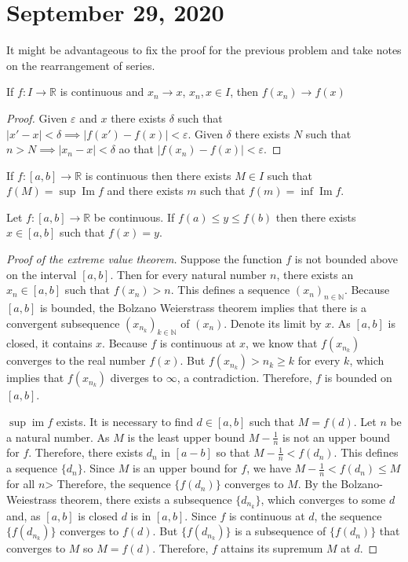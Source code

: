 \documentclass{article}
\newcommand{\N}{\mathbb{N}}
\newcommand{\R}{\mathbb{R}}
\renewcommand{\Im}{\operatorname{Im}}
\newcommand{\eps}{\varepsilon}
\newcommand{\ra}[1][]{\xrightarrow{#1}}
\DeclareMathOperator{\im}{im}
\begin{document}
\section{September 29, 2020}
\begin{remark}
It might be advantageous to fix the proof for the previous problem and take notes on the rearrangement of series.
\end{remark}
\begin{proposition}
If $f:I\ra \R$ is continuous and $x_n\ra x$, $x_n,x\in I$, then $f(x_n)\ra f(x)$
\end{proposition}
\begin{proof}
Given $\eps$ and $x$ there exists $\delta$ such that $|x'-x|<\delta\implies |f(x')-f(x)|<\eps$. Given $\delta$ there exists $N$ such that $n>N\implies |x_n-x|<\delta$ ao that $|f(x_n)-f(x)|<\eps$.
\end{proof}
\begin{theorem}
If $f:[a,b]\ra \R$ is continuous then there exists $M\in I$ such that $f(M)=\sup\Im f$ and there exists $m$ such that $f(m)=\inf\Im f$.
\end{theorem}
\begin{theorem}
Let $f:[a,b]\ra \R$ be continuous. If $f(a)\leq y\leq f(b)$ then there exists $x\in [a,b]$ such that $f(x)=y$.
\end{theorem}
\begin{proof}[Proof of the extreme value theorem]
Suppose the function $f$ is not bounded above on the interval $[a,b]$. Then for every natural number $n$, there exists an $x_n\in [a,b]$ such that $f(x_n)>n$. This defines a sequence $(x_n)_{n\in\N}$. Because $[a,b]$ is bounded, the Bolzano Weierstrass theorem implies that there is a convergent subsequence $(x_{n_k})_{k\in\N}$ of $(x_n)$. Denote its limit by $x$. As $[a,b]$ is closed, it contains $x$. Because $f$ is continuous at $x$, we know that $f(x_{n_k})$ converges to the real number $f(x)$. But $f(x_{n_k})>n_k\geq k$ for every $k$, which implies that $f(x_{n_k})$ diverges to $\infty$, a contradiction. Therefore, $f$ is bounded on $[a,b]$.

$\sup\im f$ exists. It is necessary to find $d\in [a,b]$ such that $M=f(d)$. Let $n$ be a natural number. As $M$ is the least upper bound $M-\frac{1}{n}$ is not an upper bound for $f$. Therefore, there exists $d_n$ in $[a-b]$ so that $M-\frac{1}{n}<f(d_n)$. This defines a sequence $\{d_n\}$. Since $M$ is an upper bound for $f$, we have $M-\frac{1}{n}<f(d_n)\leq M$ for all $n$> Therefore, the sequence $\{f(d_n)\}$ converges to $M$. By the Bolzano-Weiestrass theorem, there exists a subsequence $\{d_{n_k}\}$, which converges to some $d$ and, as $[a,b]$ is closed $d$ is in $[a,b]$. Since $f$ is continuous at $d$, the sequence $\{f(d_{n_k})\}$ converges to $f(d)$. But $\{f(d_{n_k})\}$ is a subsequence of $\{f(d_n)\}$ that converges to $M$ so $M=f(d)$. Therefore, $f$ attains its supremum $M$ at $d$.
\end{proof}
\end{document}
